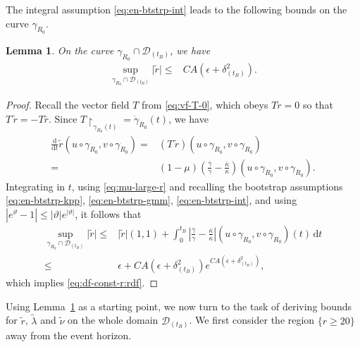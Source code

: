 \documentclass[10pt, reqno]{amsart}
\newtheorem{lemma}[theorem]{Lemma}
\theoremstyle{definition}
\theoremstyle{remark}
\theoremstyle{conjecture}
\numberwithin{equation}{section}
\newcommand{\abs}[1]{\vert#1\vert}
\newcommand{\set}[1]{\{#1\}}
\newcommand{\ud}{\mathrm{d}}
\newcommand{\0}{\emptyset}
\newcommand{\gmm}{\gamma}
\newcommand{\dlt}{\delta}
\newcommand{\eps}{\epsilon}
\newcommand{\kpp}{\kappa}
\newcommand{\lmb}{\lambda}
\newcommand{\calD}{\mathcal D}
\newcommand{\dur}{\nu}
\newcommand{\dvr}{\lmb}
\newcommand{\dvrbg}{\overline{\dvr}}				%
\newcommand{\durbg}{\overline{\dur}}				%
\newcommand{\rbg}{\overline{r}}					%
\newcommand{\kppbg}{\overline{\kpp}}					%
\newcommand{\gmmbg}{\overline{\gmm}}					%
\newcommand{\dvrdf}{\widetilde{\dvr}}				%
\newcommand{\durdf}{\widetilde{\dur}}				%
\newcommand{\rdf}{\widetilde{r}}					%
\newcommand{\Abs}[1]{\left\vert #1 \right\vert}
\begin{document}
The integral assumption \eqref{eq:en-btstrp-int} leads to the following bounds on the curve $\gmm_{R_{0}}$.
\begin{lemma} \label{lem:df-const-r}
On the curve $\gmm_{R_{0}} \cap \calD_{(t_{B})}$, we have
\begin{align} 
	\sup_{\gmm_{R_{0}} \cap \calD_{(t_{B})}} \abs{\rdf} 
\leq &	C A \left( \eps + \dlt_{(t_{B})}^{2} \right) . \label{eq:df-const-r:rdf} 
\end{align}
\end{lemma}
\begin{proof}
Recall the vector field $T$ from \eqref{eq:vf-T-0}, which obeys $T r = 0$ so that $T \, \rdf = - T \rbg$. Since $T \restriction_{\gmm_{R_{0}}(t)} = \dot{\gmm}_{R_{0}}(t)$, we have
\begin{align*}
	\frac{\ud}{\ud t} \rdf(u \circ \gmm_{R_{0}}, v \circ \gmm_{R_{0}}) 
=& 	(T \, \rdf) (u \circ \gmm_{R_{0}}, v \circ \gmm_{R_{0}})  \\
= & (1-\mu) \left( \frac{\gmmbg}{\gmm} - \frac{\kppbg}{\kpp} \right) (u \circ \gmm_{R_{0}}, v \circ \gmm_{R_{0}}).
\end{align*}
Integrating in $t$, using \eqref{eq:mu-large-r} and recalling the bootstrap assumptions \eqref{eq:en-btstrp-kpp}, \eqref{eq:en-btstrp-gmm}, \eqref{eq:en-btstrp-int}, and using $|e^{\vartheta}-1|\leq |\vartheta| e^{|\vartheta|}$, it follows that
\begin{align*}
	\sup_{\gmm_{R_{0}} \cap \calD_{(t_{B})}} \abs{\rdf}
	\leq & \abs{\rdf} (1, 1) + \int_{0}^{t_{B}} \Abs{\frac{\gmmbg}{\gmm} - \frac{\kppbg}{\kpp}}  
						(u \circ \gmm_{R_{0}}, v \circ \gmm_{R_{0}})(t) \, \ud t \\
	\leq & \eps + C A (\eps + \dlt_{(t_{B})}^{2}) e^{C A (\eps + \dlt_{(t_{B})}^{2})},		
\end{align*}
which implies \eqref{eq:df-const-r:rdf}.  \qedhere
\end{proof}

Using Lemma~\ref{lem:df-const-r} as a starting point, we now turn to the task of deriving bounds for $\rdf$, $\dvrdf$ and $\durdf$ on the whole domain $\calD_{(t_{B})}$. We first consider the region $\set{r \geq 20}$ away from the event horizon.
\end{document}
